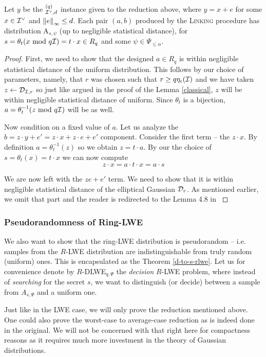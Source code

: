 \begin{lemma}\label{correctness}
	Let $y$ be the $_{\mathcal{I}^{\vee},d}^{(q)}$ instance given to the reduction above, where $y = x + e$ for some $x \in \mathcal{I}^{\vee}$ and $\norm{e}_{\infty} \leq d$. Each pair $(a, b)$ produced by the \textsc{Linking} procedure has distribution A$_{s,\psi}$ (up to negligible statistical distance), for $s = \theta_t(x \text{ mod } q\mathcal{I}) = t \cdot x \in R_q$ and some $\psi \in \Psi_{\leq \alpha}$.
\end{lemma}
\begin{proof}
	First, we need to show that the designed $a \in R_q$ is within negligible statistical distance of the uniform distribution. This follows by our choice of parameters, namely, that $r$ was chosen such that $r \geq q \eta_{\epsilon}(\mathcal{I})$ and we have taken $z \leftarrow \mathcal{D}_{\mathcal{I}, r}$ so just like argued in the proof of the Lemma \ref{classical}, $z$ will be within negligible statistical distance of uniform. Since $\theta_t$ is a bijection, $a = \theta_t^{-1}(z \text{ mod } q\mathcal{I})$ will be as well.

	Now condition on a fixed value of $a$. Let us analyze the $b = z \cdot y + e' = z \cdot x + z \cdot e + e'$ component. Consider the first term -- the $z \cdot x$. By definition $a = \theta_t^{-1}(z)$ so we obtain $z = t \cdot a$. By our the choice of $s = \theta_t(x) = t \cdot x$ we can now compute
	\[ z \cdot x = a \cdot t \cdot x = a \cdot s \]

	We are now left with the $ze + e'$ term. We need to show that it is within negligible statistical distance of the elliptical Gaussian $\mathcal{D}_r$. As mentioned earlier, we omit that part and the reader is redirected to the Lemma 4.8 in \cite{ring-lwe}
\end{proof}
\subsubsection{Pseudorandomness of Ring-LWE}\label{pseudo-rlwe}
We also want to show that the ring-LWE distribution is pseudorandom -- i.e. samples from the $R$-LWE distribution are indistinguishable from truly random (uniform) ones. This is encapsulated as the Theorem \ref{d-to-s-rlwe}. Let us for convenience denote by $R$-DLWE$_{q,\Psi}$ the \textit{decision} $R$-LWE problem, where instead of \textit{searching} for the secret $s$, we want to distinguish (or decide) between a sample from $A_{s, \Psi}$ and a uniform one.

Just like in the LWE case, we will only prove the reduction mentioned above. One could also prove the worst-case to average-case reduction as is indeed done in the original. We will not be concerned with that right here for compactness reasons as it requires much more investment in the theory of Gaussian distributions.

